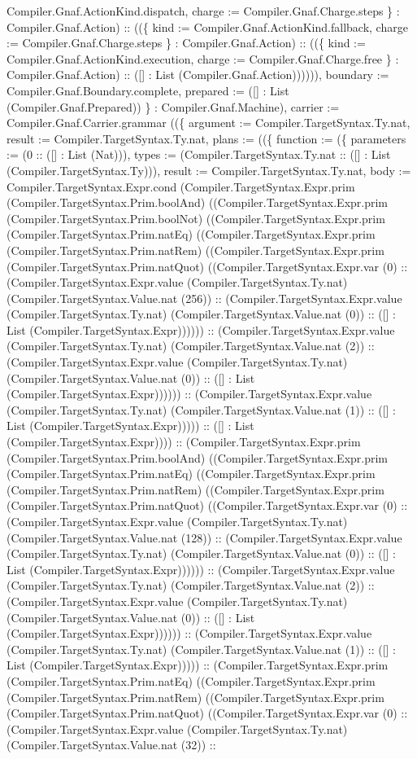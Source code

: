\documentclass[11pt]{article}
\begin{document}
Compiler.Gnaf.ActionKind.dispatch, charge := Compiler.Gnaf.Charge.steps \} : Compiler.Gnaf.Action) :: ((\{ kind := Compiler.Gnaf.ActionKind.fallback, charge := Compiler.Gnaf.Charge.steps \} : Compiler.Gnaf.Action) :: ((\{ kind := Compiler.Gnaf.ActionKind.execution, charge := Compiler.Gnaf.Charge.free \} : Compiler.Gnaf.Action) :: ([] : List (Compiler.Gnaf.Action)))))), boundary := Compiler.Gnaf.Boundary.complete, prepared := ([] : List (Compiler.Gnaf.Prepared)) \} : Compiler.Gnaf.Machine), carrier := Compiler.Gnaf.Carrier.grammar ((\{ argument := Compiler.TargetSyntax.Ty.nat, result := Compiler.TargetSyntax.Ty.nat, plans := ((\{ function := (\{ parameters := (0 :: ([] : List (Nat))), types := (Compiler.TargetSyntax.Ty.nat :: ([] : List (Compiler.TargetSyntax.Ty))), result := Compiler.TargetSyntax.Ty.nat, body := Compiler.TargetSyntax.Expr.cond (Compiler.TargetSyntax.Expr.prim (Compiler.TargetSyntax.Prim.boolAnd) ((Compiler.TargetSyntax.Expr.prim (Compiler.TargetSyntax.Prim.boolNot) ((Compiler.TargetSyntax.Expr.prim (Compiler.TargetSyntax.Prim.natEq) ((Compiler.TargetSyntax.Expr.prim (Compiler.TargetSyntax.Prim.natRem) ((Compiler.TargetSyntax.Expr.prim (Compiler.TargetSyntax.Prim.natQuot) ((Compiler.TargetSyntax.Expr.var (0) :: (Compiler.TargetSyntax.Expr.value (Compiler.TargetSyntax.Ty.nat) (Compiler.TargetSyntax.Value.nat (256)) :: (Compiler.TargetSyntax.Expr.value (Compiler.TargetSyntax.Ty.nat) (Compiler.TargetSyntax.Value.nat (0)) :: ([] : List (Compiler.TargetSyntax.Expr)))))) :: (Compiler.TargetSyntax.Expr.value (Compiler.TargetSyntax.Ty.nat) (Compiler.TargetSyntax.Value.nat (2)) :: (Compiler.TargetSyntax.Expr.value (Compiler.TargetSyntax.Ty.nat) (Compiler.TargetSyntax.Value.nat (0)) :: ([] : List (Compiler.TargetSyntax.Expr)))))) :: (Compiler.TargetSyntax.Expr.value (Compiler.TargetSyntax.Ty.nat) (Compiler.TargetSyntax.Value.nat (1)) :: ([] : List (Compiler.TargetSyntax.Expr))))) :: ([] : List (Compiler.TargetSyntax.Expr)))) :: (Compiler.TargetSyntax.Expr.prim (Compiler.TargetSyntax.Prim.boolAnd) ((Compiler.TargetSyntax.Expr.prim (Compiler.TargetSyntax.Prim.natEq) ((Compiler.TargetSyntax.Expr.prim (Compiler.TargetSyntax.Prim.natRem) ((Compiler.TargetSyntax.Expr.prim (Compiler.TargetSyntax.Prim.natQuot) ((Compiler.TargetSyntax.Expr.var (0) :: (Compiler.TargetSyntax.Expr.value (Compiler.TargetSyntax.Ty.nat) (Compiler.TargetSyntax.Value.nat (128)) :: (Compiler.TargetSyntax.Expr.value (Compiler.TargetSyntax.Ty.nat) (Compiler.TargetSyntax.Value.nat (0)) :: ([] : List (Compiler.TargetSyntax.Expr)))))) :: (Compiler.TargetSyntax.Expr.value (Compiler.TargetSyntax.Ty.nat) (Compiler.TargetSyntax.Value.nat (2)) :: (Compiler.TargetSyntax.Expr.value (Compiler.TargetSyntax.Ty.nat) (Compiler.TargetSyntax.Value.nat (0)) :: ([] : List (Compiler.TargetSyntax.Expr)))))) :: (Compiler.TargetSyntax.Expr.value (Compiler.TargetSyntax.Ty.nat) (Compiler.TargetSyntax.Value.nat (1)) :: ([] : List (Compiler.TargetSyntax.Expr))))) :: (Compiler.TargetSyntax.Expr.prim (Compiler.TargetSyntax.Prim.natEq) ((Compiler.TargetSyntax.Expr.prim (Compiler.TargetSyntax.Prim.natRem) ((Compiler.TargetSyntax.Expr.prim (Compiler.TargetSyntax.Prim.natQuot) ((Compiler.TargetSyntax.Expr.var (0) :: (Compiler.TargetSyntax.Expr.value (Compiler.TargetSyntax.Ty.nat) (Compiler.TargetSyntax.Value.nat (32)) :: 
\end{document}
